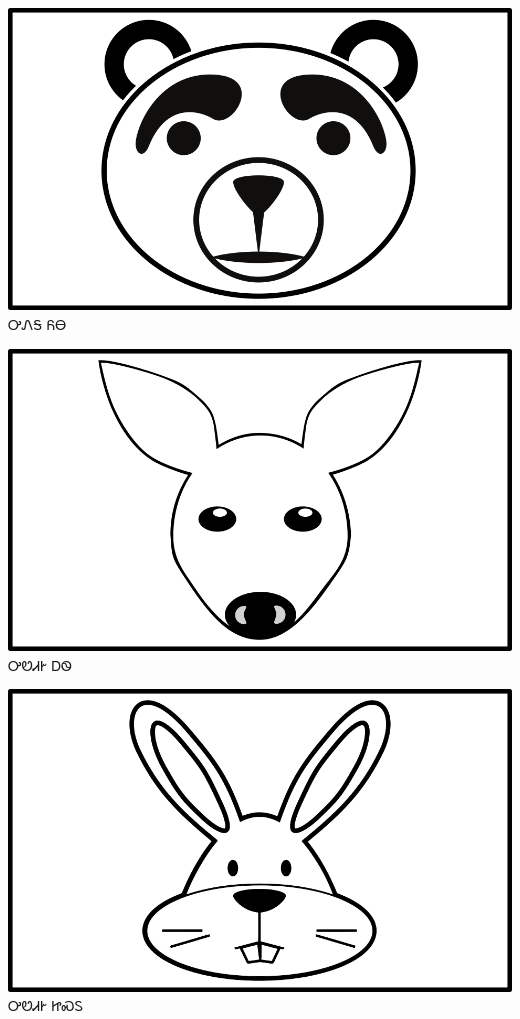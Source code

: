 \documentclass[avery5371]{flashcards}%
\begin{document}
    \begin{flashcard}{
        \includegraphics[width=0.95\columnwidth,height=.51\columnwidth,keepaspectratio]{../artwork/objects-animate/yona}
    }
        \Huge ᎤᏁᎦ ᏲᎾ
    \end{flashcard}

    \begin{flashcard}{
        \includegraphics[width=0.95\columnwidth,height=.51\columnwidth,keepaspectratio]{../artwork/objects-animate/ahwi}
    }
        \Huge ᎤᏬᏗᎨ ᎠᏫ
    \end{flashcard}

    \begin{flashcard}{
        \includegraphics[width=0.95\columnwidth,height=.51\columnwidth,keepaspectratio]{../artwork/objects-animate/jisdu}
    }
        \Huge ᎤᏬᏗᎨ ᏥᏍᏚ
    \end{flashcard}
\end{document}
